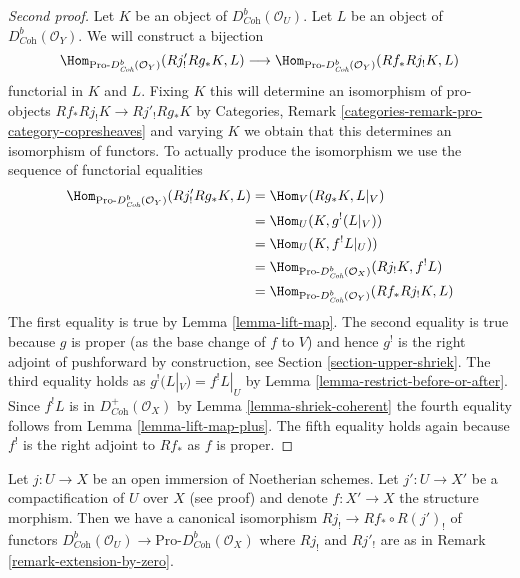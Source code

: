 \begin{proof}[Second proof]
Let $K$ be an object of $D^b_{\textit{Coh}}(\mathcal{O}_U)$.
Let $L$ be an object of $D^b_{\textit{Coh}}(\mathcal{O}_Y)$.
We will construct a bijection
$$
\Hom_{\text{Pro-}D^b_{\textit{Coh}}(\mathcal{O}_Y)}(Rj'_!Rg_*K, L)
\longrightarrow
\Hom_{\text{Pro-}D^b_{\textit{Coh}}(\mathcal{O}_Y)}(Rf_*Rj_!K, L)
$$
functorial in $K$ and $L$. Fixing $K$ this will determine an isomorphism
of pro-objects
$Rf_*Rj_!K \to Rj'_!Rg_*K$
by Categories, Remark \ref{categories-remark-pro-category-copresheaves}
and varying $K$ we obtain that this determines
an isomorphism of functors. To actually produce the isomorphism we
use the sequence of functorial equalities
\begin{align*}
\Hom_{\text{Pro-}D^b_{\textit{Coh}}(\mathcal{O}_Y)}(Rj'_!Rg_*K, L)
& =
\Hom_V(Rg_*K, L|_V) \\
& =
\Hom_U(K, g^!(L|_V)) \\
& =
\Hom_U(K, f^!L|_U)) \\
& =
\Hom_{\text{Pro-}D^b_{\textit{Coh}}(\mathcal{O}_X)}(Rj_!K, f^!L) \\
& =
\Hom_{\text{Pro-}D^b_{\textit{Coh}}(\mathcal{O}_Y)}(Rf_*Rj_!K, L)
\end{align*}
The first equality is true by Lemma \ref{lemma-lift-map}.
The second equality is true because $g$ is proper (as the base change
of $f$ to $V$) and hence $g^!$ is the right adjoint of pushforward by
construction, see Section \ref{section-upper-shriek}.
The third equality holds as $g^!(L|_V) = f^!L|_U$ by
Lemma \ref{lemma-restrict-before-or-after}.
Since $f^!L$ is in $D^+_{\textit{Coh}}(\mathcal{O}_X)$ by
Lemma \ref{lemma-shriek-coherent} the fourth equality follows from 
Lemma \ref{lemma-lift-map-plus}. The fifth equality holds again
because $f^!$ is the right adjoint to $Rf_*$ as $f$ is proper.
\end{proof}

\begin{lemma}
\label{lemma-well-defined}
Let $j : U \to X$ be an open immersion of Noetherian schemes.
Let $j' : U \to X'$ be a compactification of $U$ over $X$ (see proof)
and denote $f : X' \to X$ the structure morphism.
Then we have a canonical isomorphism $Rj_! \to Rf_* \circ R(j')_!$
of functors $D^b_{\textit{Coh}}(\mathcal{O}_U) \to
\text{Pro-}D^b_{\textit{Coh}}(\mathcal{O}_X)$ where
$Rj_!$ and $Rj'_!$ are as in Remark \ref{remark-extension-by-zero}.
\end{lemma}

